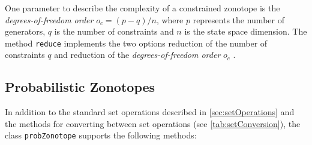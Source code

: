 One parameter to describe the complexity of a constrained zonotope is the \textit{degrees-of-freedom order} $o_c = (p-q)/n$, where $p$ represents the number of generators, $q$ is the number of constraints and $n$ is the state space dimension. The method \texttt{reduce} implements the two options reduction of the number of constraints $q$ \cite[Section 4.2]{Scott2016} and reduction of the \textit{degrees-of-freedom order} $o_c$ \cite[Section 4.3]{Scott2016}.



\subsection{Probabilistic Zonotopes}        \label{sec:probZonotopeOperations}

In addition to the standard set operations described in \cref{sec:setOperations} and the methods for converting between set operations (see \cref{tab:setConversion}), the class \texttt{probZonotope} supports the following methods:

